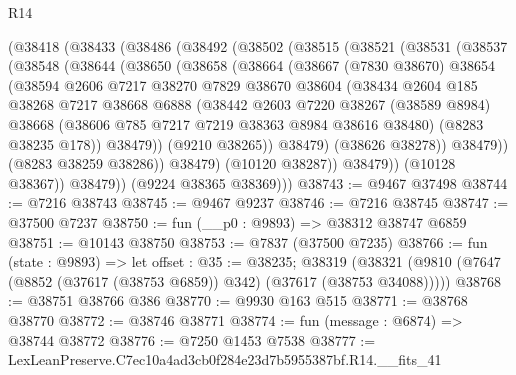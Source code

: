 \begin{lexlean}{R14}
\begin{coremodule}
    (@38418
      (@38433
        (@38486
          (@38492
            (@38502
              (@38515
                (@38521
                  (@38531
                    (@38537
                      (@38548
                        (@38644
                          (@38650
                            (@38658
                              (@38664
                                (@38667
                                  (@7830 @38670)
                                  @38654
                                  (@38594
                                    @2606
                                    @7217
                                    @38270
                                    @7829
                                    @38670
                                    @38604
                                    (@38434
                                      @2604
                                      @185
                                      @38268
                                      @7217
                                      @38668
                                      @6888
                                      (@38442
                                        @2603
                                        @7220
                                        @38267
                                        (@38589 @8984)
                                        @38668
                                        (@38606 @785 @7217 @7219 @38363 @8984 @38616 @38480)
                                        (@8283 @38235 @178))
                                      @38479))
                                  (@9210 @38265))
                                @38479)
                              (@38626 @38278))
                            @38479))
                        (@8283 @38259 @38286))
                      @38479)
                    (@10120 @38287))
                  @38479))
              (@10128 @38367))
            @38479))
        (@9224 @38365 @38369)))
@38743 := @9467 @37498
@38744 := @7216 @38743
@38745 := @9467 @9237
@38746 := @7216 @38745
@38747 := @37500 @7237
@38750 := fun (__p0 : @9893) => @38312 @38747 @6859
@38751 := @10143 @38750
@38753 := @7837 (@37500 @7235)
@38766 := fun (state : @9893) =>
  let offset : @35 := @38235;
  @38319 (@38321 (@9810 (@7647 (@8852 (@37617 (@38753 @6859)) @342) (@37617 (@38753 @34088)))))
@38768 := @38751 @38766 @386
@38770 := @9930 @163 @515
@38771 := @38768 @38770
@38772 := @38746 @38771
@38774 := fun (message : @6874) => @38744 @38772
@38776 := @7250 @1453 @7538
@38777 := LexLeanPreserve.C7ec10a4ad3cb0f284e23d7b5955387bf.R14.__fits_41

\end{coremodule}
\end{lexlean}
